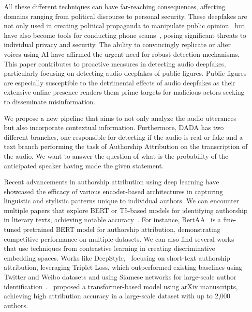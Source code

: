 \documentclass{Interspeech}
\begin{document}
All these different techniques can have far-reaching consequences, affecting
domains ranging from political discourse to personal security. These deepfakes
are not only used in creating political propaganda to manipulate public
opinion~\cite{stuanescuinformational} but have also become tools for conducting
phone scams~\cite{mirsky2022dfcaptcha}, posing significant threats to
individual privacy and security. The ability to convincingly replicate or alter
voices using AI have affirmed the urgent need for robust detection mechanisms.
This paper contributes to proactive measures in detecting audio deepfakes,
particularly focusing on detecting audio deepfakes of public figures. Public
figures are especially susceptible to the detrimental effects of audio
deepfakes as their extensive online presence renders them prime targets for
malicious actors seeking to disseminate misinformation.

We propose a new pipeline that aims to not only analyze the audio utterances
but also incorporate contextual information. Furthermore, DADA has two
different branches, one responsible for detecting if the audio is real or fake
and a text branch performing the task of Authorship Attribution on the
transcription of the audio. We want to answer the question of what is the
probability of the anticipated speaker having made the given statement.

Recent advancements in authorship attribution using deep learning have
showcased the efficacy of various encoder-based architectures in capturing
linguistic and stylistic patterns unique to individual authors. We can
encounter multiple papers that explore BERT or T5-based models for identifying
authorship in literary texts, achieving notable
accuracy~\cite{hicke2023t5,silva2024forged}. For instance,
BertAA~\cite{fabien2020bertaa} is a fine-tuned pretrained BERT model for
authorship attribution, demonstrating competitive performance on multiple
datasets. We can also find several works that use techniques from contrastive
learning in creating discriminative embedding spaces. Works like
DeepStyle,~\cite{hu2020deepstyle} focusing on short-text authorship
attribution, leveraging Triplet Loss, which outperformed existing baselines
using Twitter and Weibo datasets and using Siamese networks for large-scale
author identification~\cite{saedi2021siamese}.~\cite{bauersfeld2023cracking}
proposed a transformer-based model using arXiv manuscripts, achieving high
attribution accuracy in a large-scale dataset with up to 2,000 authors.
\end{document}
